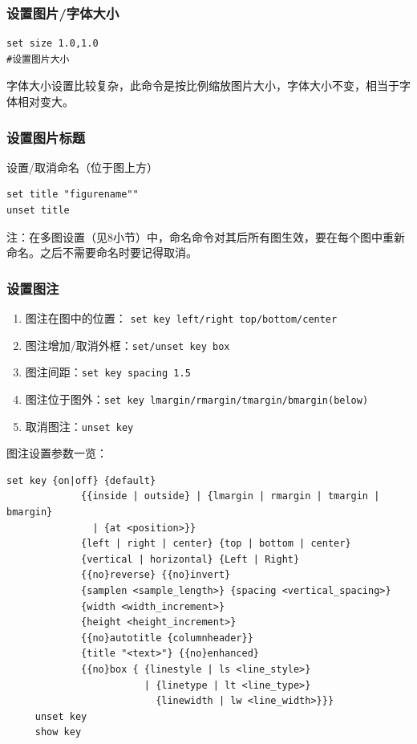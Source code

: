 \documentclass[lang=cn,10pt,newtx]{elegantbook}
\begin{document}
\subsubsection{设置图片/字体大小}
\begin{verbatim}
set size 1.0,1.0
#设置图片大小
\end{verbatim}
字体大小设置比较复杂，此命令是按比例缩放图片大小，字体大小不变，相当于字体相对变大。


\subsubsection{设置图片标题}
 设置/取消命名（位于图上方）
 \begin{verbatim}
set title "figurename""
unset title
\end{verbatim}
注：在多图设置（见8小节）中，命名命令对其后所有图生效，要在每个图中重新命名。之后不需要命名时要记得取消。


\subsubsection{设置图注}
\begin{enumerate}
\item 图注在图中的位置：
\verb*|set key left/right top/bottom/center|

\item 图注增加/取消外框：\verb*|set/unset key box|

\item 图注间距：\verb*|set key spacing 1.5|

\item 图注位于图外：\verb*|set key lmargin/rmargin/tmargin/bmargin(below)|

\item 取消图注：\verb*|unset key|
\end{enumerate}

图注设置参数一览：
\begin{verbatim}
set key {on|off} {default}
             {{inside | outside} | {lmargin | rmargin | tmargin | bmargin}
               | {at <position>}}
             {left | right | center} {top | bottom | center}
             {vertical | horizontal} {Left | Right}
             {{no}reverse} {{no}invert}
             {samplen <sample_length>} {spacing <vertical_spacing>}
             {width <width_increment>}
             {height <height_increment>}
             {{no}autotitle {columnheader}}
             {title "<text>"} {{no}enhanced}
             {{no}box { {linestyle | ls <line_style>}
                        | {linetype | lt <line_type>}
                          {linewidth | lw <line_width>}}}
     unset key
     show key
\end{verbatim}
\end{document}
